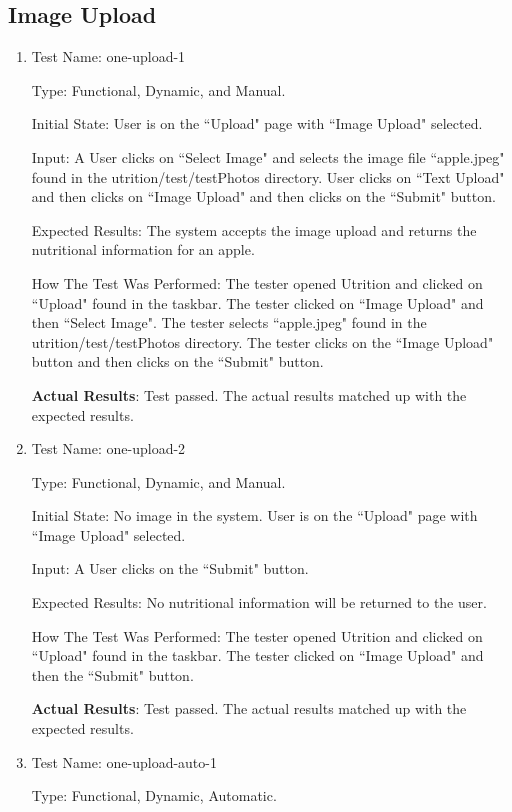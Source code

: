 \documentclass[12pt, titlepage]{article}
\begin{document}
	\subsection{Image Upload}
	\begin{enumerate}
		\item{Test Name: one-upload-1}
		
		Type: Functional, Dynamic, and Manual.
		
		Initial State: User is on the ``Upload" page with ``Image Upload" selected.
		
		Input: A User clicks on ``Select Image" and selects the image file ``apple.jpeg" found in the utrition/test/testPhotos directory. User clicks on ``Text Upload" and then clicks on ``Image Upload" and then clicks on the ``Submit" button.
		
		Expected Results: The system accepts the image upload and returns the nutritional information for an apple. 
		
		How The Test Was Performed: The tester opened Utrition and clicked on ``Upload" found in the taskbar. The tester clicked on ``Image Upload" and then ``Select Image". The tester selects ``apple.jpeg" found in the utrition/test/testPhotos directory. The tester clicks on the ``Image Upload" button and then clicks on the ``Submit" button.
		
		\textbf{Actual Results}: Test passed. The actual results matched up with the expected results. 
		
		\item{Test Name: one-upload-2}
		
		Type: Functional, Dynamic, and Manual.
		
		Initial State: No image in the system. User is on the ``Upload" page with ``Image Upload" selected.
		
		Input: A User clicks on the ``Submit" button.
		
		Expected Results: No nutritional information will be returned to the user.
		
		How The Test Was Performed: The tester opened Utrition and clicked on ``Upload" found in the taskbar. The tester clicked on ``Image Upload" and then the ``Submit" button.
		
		\textbf{Actual Results}: Test passed. The actual results matched up with the expected results.

		\item{Test Name: one-upload-auto-1}
		
		Type: Functional, Dynamic, Automatic.
		

\end{enumerate}
\end{document}
